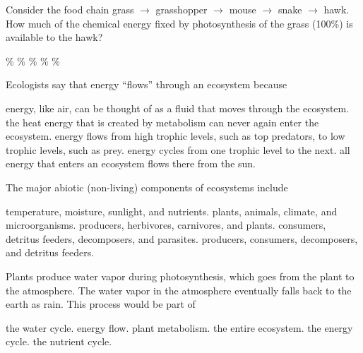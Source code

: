 \question
Consider the food chain grass $\to$ grasshopper $\to$ mouse $\to$ snake $\to$ hawk. How much of the chemical energy fixed by photosynthesis of the grass (100\%) is available to the hawk?

\begin{choices}
\% %
\% %
\% %
\% %
\% %
\end{choices}







\question
Ecologists say that energy ``flows'' through an ecosystem because

\begin{choices}
\choice energy, like air, can be thought of as a fluid that moves through the ecosystem.%
\correctchoice the heat energy that is created by metabolism can never again enter the ecosystem.%
\choice energy flows from high trophic levels, such as top predators, to low trophic levels, such as prey.%
\choice energy cycles from one trophic level to the next.%
\choice all energy that enters an ecosystem flows there from the sun.%
\end{choices}


\question
The major abiotic (non-living) components of ecosystems include

\begin{choices}
\correctchoice temperature, moisture, sunlight, and nutrients.%
\choice plants, animals, climate, and microorganisms.%
\choice producers, herbivores, carnivores, and plants.%
\choice consumers, detritus feeders, decomposers, and parasites.%
\choice producers, consumers, decomposers, and detritus feeders.%
\end{choices}



\question
Plants produce water vapor during photosynthesis, which goes from the plant to the atmosphere. The water vapor in the atmosphere eventually falls back to the earth as rain. This process would be part of

\begin{choices}
\correctchoice the water cycle.%
\choice energy flow.%
\choice plant metabolism.%
\choice the entire ecosystem.%
\choice the energy cycle.%
\choice the nutrient cycle.%
\end{choices}

